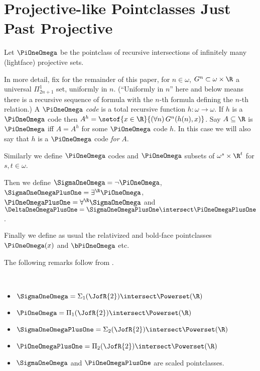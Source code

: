 \documentclass[oneside,12pt]{amsart}
\begin{document}
\section{Projective-like Pointclasses Just Past Projective}
\label{section:projectivelikepointclasses}

\begin{definition}
Let $\PiOneOmega$ be the pointclass of recursive intersections of infinitely many (lightface) projective sets.

In more detail, fix for the remainder of this paper, for $n\in\omega$, $G^n\subset\omega\times\R$
a universal $\Pi^1_{2n+1}$ set, uniformly in $n$. (``Uniformly in $n$'' here and below
means there is a recursive sequence of formula with the $n$-th formula defining the $n$-th relation.)
A $\PiOneOmega$ \emph{code} is a total recursive function $h:\omega\to\omega$. If $h$ is a $\PiOneOmega$ code then
$A^h=\setof{x\in\R}{(\forall n)\, G^n(h(n),x)}$. Say $A\subseteq\R$ is $\PiOneOmega$ iff
$A=A^h$ for some $\PiOneOmega$ code $h$. In this case we will also say that $h$
is a $\PiOneOmega$ code \emph{for} $A$.

Similarly we define $\PiOneOmega$ codes and $\PiOneOmega$ subsets of $\omega^s\times \R^t$ for $s,t\in\omega$.

Then we define $\SigmaOneOmega = \neg\PiOneOmega$, $\SigmaOneOmegaPlusOne=\exists^{\R}\PiOneOmega$,
$\PiOneOmegaPlusOne = \forall^{\R}\SigmaOneOmega$ and
$\DeltaOneOmegaPlusOne = \SigmaOneOmegaPlusOne \intersect \PiOneOmegaPlusOne$.

Finally we define as usual the relativized and bold-face
pointclasses $\PiOneOmega(x)$
and $\bPiOneOmega$ etc.
\end{definition}

The following remarks follow from \cite{Scales_In_LofR}.
\begin{remarks} \
\begin{itemize}
\item $\SigmaOneOmega = \Sigma_1(\JofR{2}) \intersect \Powerset(\R)$
\item $\PiOneOmega = \Pi_1(\JofR{2}) \intersect \Powerset(\R)$
\item $\SigmaOneOmegaPlusOne = \Sigma_2(\JofR{2}) \intersect \Powerset(\R)$
\item $\PiOneOmegaPlusOne = \Pi_2(\JofR{2}) \intersect \Powerset(\R)$
\item $\SigmaOneOmega$ and $\PiOneOmegaPlusOne$
are scaled pointclasses.
\end{itemize}
\end{remarks}
\end{document}
